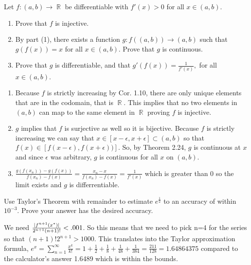 \documentclass[12pt,letterpaper,boxed]{hmcpset}
\DeclareMathOperator{\R}{\mathbb{R}}
\DeclarePairedDelimiter\abs{\lvert}{\rvert}%
\begin{document}
\begin{problem}[Exercise 1.12]
Let $f: (a,b) \rightarrow \R$ be differentiable with $f'(x) > 0$ for all $x\in(a,b)$.
\begin{enumerate}
    \item Prove that $f$ is injective.
    \item By part (1), there exists a function $g : f((a,b))\rightarrow (a,b)$ such that $g(f(x))= x$ for all $x\in(a, b).$ Prove that $g$ is continuous.
    \item Prove that $g$ is differentiable, and that $g'(f(x))= \frac{1}{f'(x)},$ for all $x \in (a,b)$.
\end{enumerate}
\end{problem}

\begin{solution}
\begin{enumerate}
    \item Because $f$ is strictly increasing by Cor. 1.10, there are only unique elements that are in the codomain, that is $\R$. This implies that no two elements in $(a,b)$ can map to the same element in $\R$ proving $f$ is injective.
    \item $g$ implies that $f$ is surjective as well so it is bijective. Because $f$ is strictly increasing we can say that $x \in [x - \epsilon, x + \epsilon]\subset (a,b)$ so that $f(x) \in [f(x - \epsilon), f(x + \epsilon))]$. So, by Theorem 2.24, $g$ is continuous at $x$ and since $\epsilon$ was arbitrary, $g$ is continuous for all $x$ on $(a,b)$. 
    \item $\frac{g(f(x_n)) - g(f(x))}{f(x_n) - f(x)} = \frac{x_n - x}{f(x_n) - f(x)} = \frac{1}{f'(x)}$ which is greater than 0 so the limit exists and $g$ is differrentiable. 
\end{enumerate}
\end{solution}

\begin{problem}[Exercise 1.17]
Use Taylor's Theorem with remainder to estimate $e^{\frac{1}{2}}$ to an accuracy of within $10^{-3}.$ Prove your answer has the desired accuracy.
\end{problem}

\begin{solution}
We need $\frac{\abs{f^{n+1}(x^{*})}}{2^{n + 1}(n + 1)!} < .001$. So this means that we need to pick n=4 for the series so that $(n + 1)!2^{n + 1} > 1000$. This translates into the Taylor approximation formula, $e^{x}=\sum_{n=1}^{\infty} \frac{x^{k}}{k!} = 1 + \frac{1}{2} + \frac{1}{8} + \frac{1}{48} + \frac{1}{384} = \frac{211}{128}=1.64864375$ compared to the calculator's answer 1.6489 which is within the bounds.
\end{solution}
\end{document}
